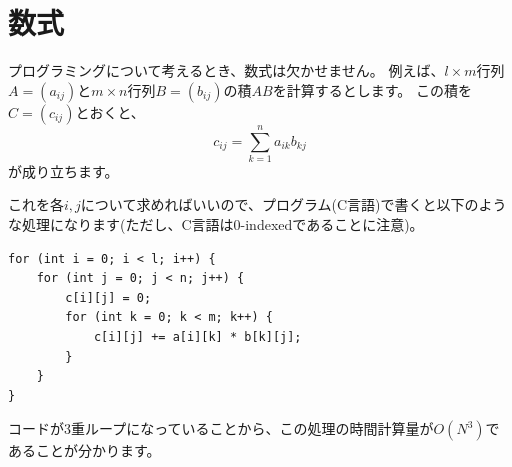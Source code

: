 \documentclass{ltjsarticle}
\begin{document}
\section{数式}
プログラミングについて考えるとき、数式は欠かせません。
例えば、$l \times m$行列$A = (a_{ij})$と$m \times n$行列$B = (b_{ij})$の積$AB$を計算するとします。
この積を$C = (c_{ij})$とおくと、
\begin{equation}
    c_{ij} = \sum_{k=1}^n a_{ik}b_{kj}
\end{equation}
が成り立ちます。

これを各$i,j$について求めればいいので、プログラム(C言語)で書くと以下のような処理になります(ただし、C言語は0-indexedであることに注意)。
\begin{lstlisting}[language=myC]
for (int i = 0; i < l; i++) {
    for (int j = 0; j < n; j++) {
        c[i][j] = 0;
        for (int k = 0; k < m; k++) {
            c[i][j] += a[i][k] * b[k][j];
        }
    }
}
\end{lstlisting}
コードが3重ループになっていることから、この処理の時間計算量が$O(N^3)$であることが分かります。
\end{document}
